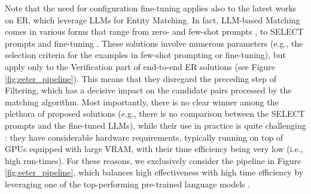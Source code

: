 {
Note that the need for configuration fine-tuning applies also to the latest works on ER, which leverage LLMs for Entity Matching. In fact, LLM-based Matching comes in various forms that range from zero- and few-shot prompts \cite{DBLP:conf/edbt/PeetersSB25}, to SELECT prompts \cite{DBLP:conf/coling/WangCLCHSWZ25} and fine-tuning \cite{DBLP:journals/corr/abs-2409-08185}. These solutions involve numerous parameters (e.g., the selection criteria for the examples in few-shot prompting or fine-tuning), but apply only to the Verification part of end-to-end ER solutions (see Figure \ref{fig:eeter_pipeline}). This means that they disregard the preceding step of Filtering, which has a decisive impact on the candidate pairs processed by the matching algorithm. Most importantly, there is no clear winner among the plethora of proposed solutions (e.g., there is no comparison between the SELECT prompts and the fine-tuned LLMs), while their use in practice is quite challenging \cite{DBLP:conf/edbt/PeetersSB25,DBLP:conf/coling/WangCLCHSWZ25,DBLP:journals/corr/abs-2409-08185}: they have considerable hardware requirements, typically running on top of GPUs equipped with large VRAM, with their time efficiency being very low (i.e., high run-times). For these reasons, we exclusively consider the pipeline in Figure \ref{fig:eeter_pipeline}, which balances high effectiveness with high time efficiency by leveraging one of the top-performing pre-trained language models \cite{DBLP:journals/pvldb/ZeakisPSK23}.
}


